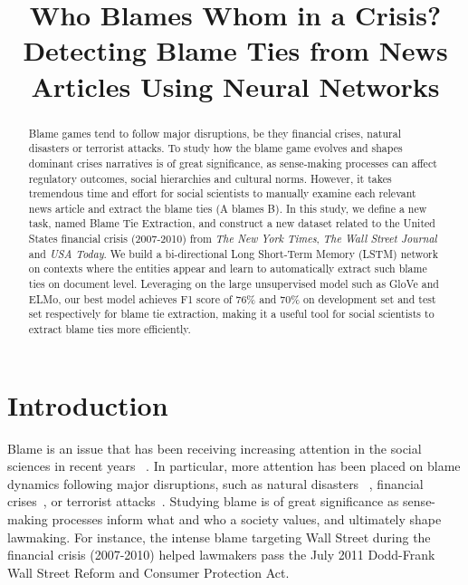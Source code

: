 \documentclass[letterpaper]{article} %
\begin{document}
\title{Who Blames Whom in a Crisis? Detecting Blame Ties from News Articles Using Neural Networks}
\maketitle
\begin{abstract}
Blame games tend to follow major disruptions, be they financial crises, natural disasters or terrorist attacks. To study how the blame game evolves and shapes dominant crises narratives is of great significance, as sense-making processes can affect regulatory outcomes, social hierarchies and cultural norms. However, it takes tremendous time and effort for social scientists to manually examine each relevant news article and extract the blame ties (A blames B). In this study, we define a new task, named Blame Tie Extraction, and construct a new dataset related to the United States financial crisis (2007-2010) from {\it The New York Times}, {\it The Wall Street Journal} and {\it USA Today}. We build a bi-directional Long Short-Term Memory (LSTM) network on contexts where the entities appear and learn to automatically extract such blame ties on document level. Leveraging on the large unsupervised model such as GloVe and ELMo, our best model achieves F1 score of 76\% and 70\% on development set and test set respectively for blame tie extraction, making it a useful tool for social scientists to extract blame ties more efficiently.
\end{abstract}

\section{Introduction}

Blame is an issue that has been receiving increasing attention in the social sciences in recent years ~\cite{alicke2000culpable,mary1992risk,farmer2006aids,gephart1993textual,hobolt2014blaming,hood2010blame,shaver2012attribution,tilly2009credit}. In particular, more attention has been placed on blame dynamics following major disruptions, such as natural disasters ~\cite{boin2010leadership,malhotra2008attributing}, financial crises~\cite{nicolno,tourish2012metaphors}, or terrorist attacks~\cite{olmeda2008reversal}. Studying blame is of great significance as sense-making processes inform what and who a society values, and ultimately shape lawmaking. For instance, the intense blame targeting Wall Street during the financial crisis (2007-2010) helped lawmakers pass the July 2011 Dodd-Frank Wall Street Reform and Consumer Protection Act.
\end{document}
